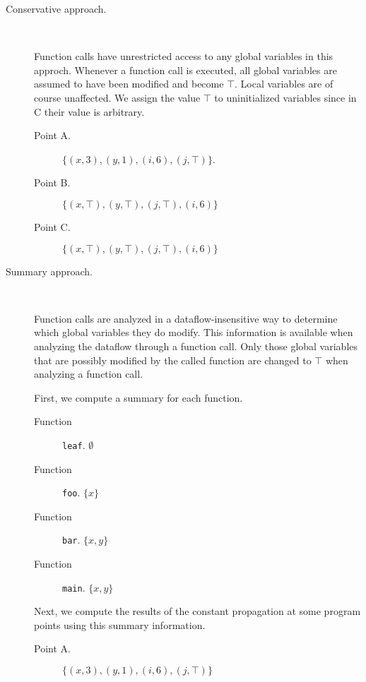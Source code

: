 \documentclass[letterpaper,11pt]{article}
\newcommand{\codesnip}{\texttt}
\begin{document}
\begin{description}
  \item[Conservative approach.] ~

    Function calls have unrestricted access to any global variables in this
    approch. Whenever a function call is executed, all global variables are
    assumed to have been modified and become $\top$. Local variables are of
    course unaffected. We assign the value $\top$ to uninitialized variables
    since in C their value is arbitrary.

    \begin{description}
      \item[Point A.]
        $\{ (x, 3), (y, 1), (i, 6), (j, \top)\}$.

      \item[Point B.]
        $\{ (x, \top), (y, \top), (j, \top), (i, 6) \}$

      \item[Point C.]
        $\{ (x, \top), (y, \top), (j, \top), (i, 6) \}$
    \end{description}

  \item[Summary approach.] ~

    Function calls are analyzed in a dataflow-insensitive way to determine
    which global variables they do modify. This information is available when
    analyzing the dataflow through a function call. Only those global variables
    that are possibly modified by the called function are changed to $\top$
    when analyzing a function call.

    First, we compute a summary for each function.

    \begin{description}
      \item[Function] \codesnip{leaf}.  $\emptyset$
      \item[Function] \codesnip{foo}. $\{ x \}$
      \item[Function] \codesnip{bar}. $\{ x, y \}$
      \item[Function] \codesnip{main}. $\{ x, y \}$
    \end{description}

    Next, we compute the results of the constant propagation at some program
    points using this summary information.

    \begin{description}
      \item[Point A.]
        $\{ (x, 3), (y, 1), (i, 6), (j, \top) \}$


\end{description}
\end{description}
\end{document}
